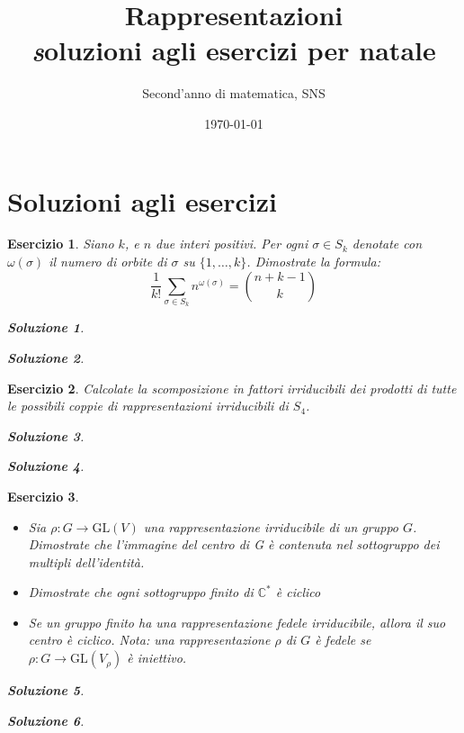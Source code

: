 \documentclass[a4paper]{article}
\title{Rappresentazioni \\ { \textit soluzioni agli esercizi per natale }}
\author{Second'anno di matematica, SNS}
\date{\today}
\theoremstyle{break}
\newtheorem{ex}{{ \Large Esercizio} }
\theoremstyle{plain}
\newtheorem{sol}{Soluzione}[ex]
\begin{document}
\maketitle

\section*{Soluzioni agli esercizi}
\begin{ex} 
Siano $k$, e $n$ due interi positivi. Per ogni $\sigma \in S_k$ denotate con $\omega(\sigma)$ il numero di orbite di $\sigma$ su $\{1, \ldots, k\}$. Dimostrate la formula:
$$ \frac{1}{k!} \sum_{\sigma \in S_k} n^{\omega(\sigma)} = \binom{n+k-1}{k} $$

\begin{sol} 
	
\end{sol}

\begin{sol}

\end{sol}


\end{ex}

\begin{ex}
Calcolate la scomposizione in fattori irriducibili dei prodotti di tutte le possibili coppie di rappresentazioni irriducibili di $S_4$.

\begin{sol}

\end{sol}

\begin{sol}

\end{sol}


\end{ex}

\begin{ex}

\begin{itemize}
\item[(a)]  Sia $\rho: G \to \mathrm{GL}(V) $ una rappresentazione irriducibile di un gruppo $G$. Dimostrate che l’immagine del centro di G è contenuta nel sottogruppo dei multipli dell’identità.

\item[(b)] Dimostrate che ogni sottogruppo finito di $\mathbb{C}^*$ è ciclico

\item[(c)] Se un gruppo finito ha una rappresentazione fedele irriducibile, allora il suo centro è ciclico. Nota: una rappresentazione $\rho$ di $G$ è fedele se $\rho: G \to \mathrm{GL}(V_{\rho}) $ è iniettivo.

\end{itemize}
\begin{sol}

\end{sol}

\begin{sol}

\end{sol}


\end{ex}
\end{document}
